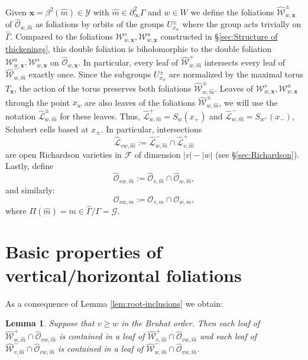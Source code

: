 \documentclass[12pt]{amsbook}%
\newtheorem{lem}[thm]{Lemma}
\theoremstyle{definition}
\theoremstyle{remark}
\numberwithin{section}{chapter}
\numberwithin{subsection}{section}
\numberwithin{figure}{chapter}
\newcommand\bac[1]{{\color{blue} #1} }
\def\cF{{\mathscr{F}}}
\def\cO{{\mathscr{O}}}
\def\cW{{\mathscr{W}}}
\def\cY{{\mathscr{Y}}}
\def\bx{\mathbf{x}}
\def\cL{{\mathscr{L}}}
\begin{document}
{{Given $\bx= \beta^2(\hat{m})\in \cY$ with $\hat{m} \in \partial^2_\infty \Gamma$ and $w\in W$ we define  the foliations $\hat{\cW}^\pm_{w,\bx}$ of $\hat{\cO}_{w,\hat{m}}$ as foliations by orbits of the groups  $U^\pm_{x_w}$ where the group acts trivially on $\hat{\Gamma}$. 
Compared to the foliations $\cW^s_{w, \bx} ,\cW^u_{w, \bx}$ constructed in \S \ref{sec:Structure of thickenings}, this double foliation is 
biholomorphic to the double foliation $\cW^u_{w,\bx}, \cW^s_{w,\bx}$ on $\hat{\cO}_{w,\bx}$. In particular, every leaf of 
$\hat{\cW}^+_{w,\hat{m}}$ intersects every leaf of $\hat{\cW}^-_{w,\hat{m}}$ exactly once. 
Since the subgroups $U^\pm_{x_w}$ are normalized by the maximal 
torus $T_{\bx}$, the action of the torus preserves both foliations $\hat{\cW}^\pm_{w,\hat{m}}$. Leaves of $\cW^s_{w,\bx}, \cW^u_{w,\bx}$ through the point $x_w$ are also leaves of the foliations $\hat{\cW}^\pm_{w,\hat{m}}$, we will use the notation $\hat{\cL}^\pm_{w,\hat{m}}$ for these leaves. Thus, $\hat{\cL}^+_{w,\hat{m}}= S_w(x_+)$ and 
$\hat{\cL}^-_{w,\hat{m}}= S_{w^\vee}(x_-)$, Schubert cells based at $x_\pm$. In particular, intersections 
$$
\hat{\cL}_{vw,\hat{m}}:=\hat{\cL}^-_{w,\hat{m}}\cap \hat{\cL}^+_{v,\hat{m}}
$$
are open Richardson varieties in $\cF$ of dimension $|v|-|w|$ (see \S \ref{sec:Richardson}).  Lastly, 
define 
$$
\hat{\cO}_{vw,\hat{m}}:= \hat{\cO}_{v,\hat{m}}\cap \hat{\cO}_{w,\hat{m}}, 
$$
and similarly:
$$
{\cO}_{vw,m}:= {\cO}_{v,m}\cap {\cO}_{w,m}, 
$$
where $\Pi(\hat{m}) = m \in \hat{\Gamma}/\Gamma= \mathcal{G}$. 


\section{Basic properties of vertical/horizontal foliations} 


As a consequence of Lemma \ref{lem:root-inclusions} we obtain:

\begin{lem}
Suppose that $v\ge w$ in the Bruhat order. Then each leaf of $\hat{\cW}^+_{w,\hat{m}}\cap \hat{\cO}_{vw,\hat{m}}$ is contained in a leaf of 
$\hat{\cW}^+_{v,\hat{m}}\cap \hat{\cO}_{vw,\hat{m}}$ and each  leaf of $\hat{\cW}^-_{v,\hat{m}}\cap \hat{\cO}_{vw,\hat{m}}$ is 
contained in a leaf of $\hat{\cW}^-_{w,\hat{m}}\cap \hat{\cO}_{vw,\hat{m}}$. 
\end{lem}

}}
\end{document}
